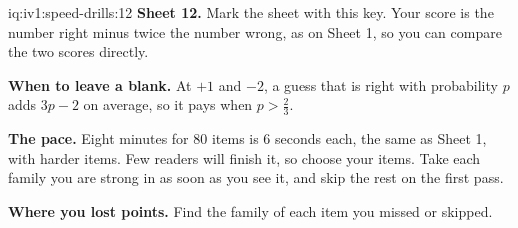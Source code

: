\begin{solution}{iq:iv1:speed-drills:12}
\textbf{Sheet 12.} Mark the sheet with this key. Your score is the number right minus twice the number wrong, as on Sheet 1, so you can compare the two scores directly.
\par\nopagebreak


\textbf{When to leave a blank.} At $+1$ and $-2$, a guess that is right with probability $p$ adds $3p - 2$ on average, so it pays when $p > \tfrac23$.

\textbf{The pace.} Eight minutes for 80 items is 6 seconds each, the same as Sheet 1, with harder items. Few readers will finish it, so choose your items. Take each family you are strong in as soon as you see it, and skip the rest on the first pass.

\textbf{Where you lost points.} Find the family of each item you missed or skipped.


\end{solution}
